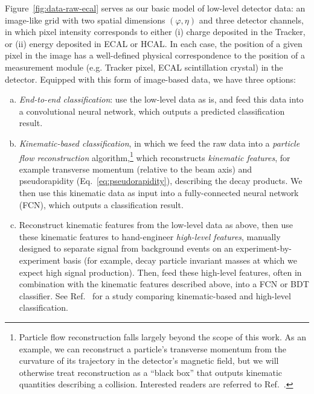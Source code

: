 \documentclass[11pt, a4paper]{article}
\begin{document}
Figure~\ref{fig:data-raw-ecal} serves as our basic model of low-level detector data: an image-like grid with two spatial dimensions $ (\varphi, \eta) $ and three detector channels, in which pixel intensity corresponds to either (i) charge deposited in the Tracker, or (ii) energy deposited in ECAL or HCAL.
In each case, the position of a given pixel in the image has a well-defined physical correspondence to the position of a measurement module (e.g. Tracker pixel, ECAL scintillation crystal) in the detector.
Equipped with this form of image-based data, we have three options:
\begin{enumerate}[(a)]

    \item \textit{End-to-end classification}: use the low-level data as is, and feed this data into a convolutional neural network, which outputs a predicted classification result.

    \item \label{item:kinematic-classification} \textit{Kinematic-based classification}, in which we feed the raw data into a \textit{particle flow reconstruction} algorithm,\footnote{Particle flow reconstruction falls largely beyond the scope of this work.
    As an example, we can reconstruct a particle's transverse momentum from the curvature of its trajectory in the detector's magnetic field, but we will otherwise treat reconstruction as a ``black box'' that outputs kinematic quantities describing a collision.
    Interested readers are referred to Ref.~\cite{particle-flow}.} which reconstructs \textit{kinematic features}, for example transverse momentum (relative to the beam axis) and pseudorapidity (Eq.~\ref{eq:pseudorapidity}), describing the decay products.
    We then use this kinematic data as input into a fully-connected neural network (FCN), which outputs a classification result.

    \item \label{item:high-level-classification} Reconstruct kinematic features from the low-level data as above, then use these kinematic features to hand-engineer \textit{high-level features}, manually designed to separate signal from background events on an experiment-by-experiment basis (for example, decay particle invariant masses at which we expect high signal production).
    Then, feed these high-level features, often in combination with the kinematic features described above, into a FCN or BDT classifier.
    See Ref.~\cite{baldi-higgs} for a study comparing kinematic-based and high-level classification.%


\end{enumerate}
\end{document}
